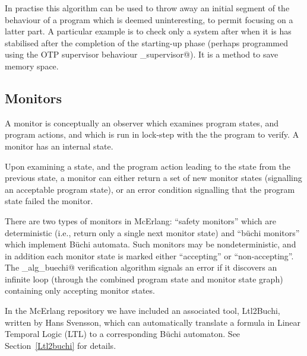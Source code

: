 \documentclass[a4paper]{article}
\begin{document}
\begin{itemize}
In practise this algorithm can be used to throw away an initial segment
of the behaviour of a program which is deemed uninteresting, to permit
focusing on a latter part. A particular example is to check only a system
after when it is has stabilised after the completion
of the starting-up phase (perhaps programmed
using the OTP supervisor behaviour \lstinline@gen_supervisor@). It is
a method to save memory space.
\end{itemize}

\subsection{Monitors}
\label{monitors}
A monitor is conceptually an observer which examines
program states, and program actions, 
and which is run in lock-step with the the program to verify.
A monitor has an internal state.

Upon examining a state, and the program action leading to the state
from the previous state, a monitor can either return a set of
new monitor states
(signalling an acceptable program state), or an error condition signalling
that the program state failed the monitor. 

There are two types of monitors in McErlang: ``safety monitors'' which
are deterministic (i.e., return only a single next monitor state) and
``b\"uchi monitors'' which implement B\"uchi automata. Such monitors
may be nondeterministic, and in addition each monitor state is marked
either ``accepting'' or ``non-accepting''. The \lstinline@mce_alg_buechi@
verification algorithm signals an error if it discovers an infinite loop
(through the combined program state and monitor state graph)
containing only accepting monitor states.

In the McErlang repository we have included
an associated tool, Ltl2Buchi, written by Hans Svensson,
which can automatically
translate a formula in Linear Temporal Logic (LTL)
to a corresponding B\"uchi automaton. See Section~\ref{Ltl2buchi} for details.
\end{document}
